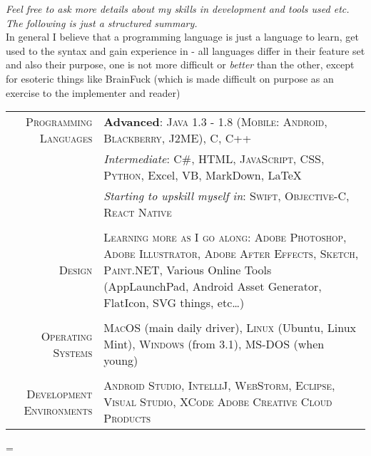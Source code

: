 \documentclass[a4paper,10pt,notitlepage]{article}
\newenvironment{absolutelynopagebreak}
  {\par\nobreak\vfil\penalty0\vfilneg
   \vtop\bgroup}
  {\par\xdef\tpd{\the\prevdepth}\egroup
   \prevdepth=\tpd}
\begin{document}
\begin{absolutelynopagebreak}
	\textit{Feel free to ask more details about my skills in development and tools used etc. The following is just a structured summary.} \\
	
	\footnotesize{In general I believe that a programming language is just a language to learn, get used to the syntax and gain experience in - all languages differ in their feature set and also their purpose, one is not more difficult or \textit{better} than the other, except for esoteric things like BrainFuck (which is made difficult on purpose as an exercise to the implementer and reader)} \\
	
	\begin{tabular}{r|p{11cm}}
		
		\textsc{Programming Languages}    & \textbf{Advanced}: \textsc{Java 1.3 - 1.8 (Mobile: Android, Blackberry, J2ME)}, \textsc{C}, \textsc{C++} \\
		                                  & \emph{Intermediate}: \textsc{C\#}, \textsc{HTML}, \textsc{JavaScript}, \textsc{CSS}, \textsc{Python}, Excel, VB, MarkDown, {\fb \LaTeX} \setmainfont[SmallCapsFont=Fontin-SmallCaps.otf]{Fontin.otf} \\
		                                  & \emph{Starting to upskill myself in}: \textsc{Swift}, \textsc{Objective-C}, \textsc{React Native} \\
		                                  
		\multicolumn{2}{c}{}\\
		
		\textsc{Design}                   & \textsc{Learning more as I go along}: \textsc{Adobe Photoshop}, \textsc{Adobe Illustrator}, \textsc{Adobe After Effects}, \textsc{Sketch}, \textsc{Paint.NET}, Various Online Tools (AppLaunchPad, Android Asset Generator, FlatIcon, SVG things, etc\ldots) \\
		
		\multicolumn{2}{c}{}\\
		
		\textsc{Operating Systems}        & \textsc{MacOS} (main daily driver), \textsc{Linux} (Ubuntu, Linux Mint), \textsc{Windows} (from 3.1), \textsc{MS-DOS} (when young) \\
		 
		\multicolumn{2}{c}{} \\
		 
		\textsc{Development Environments} & \textsc{Android Studio}, \textsc{IntelliJ}, \textsc{WebStorm}, \textsc{Eclipse}, \textsc{Visual Studio}, \textsc{XCode} \textsc{Adobe Creative Cloud Products} \\
		 

\end{tabular}
\end{absolutelynopagebreak}
\end{document}
